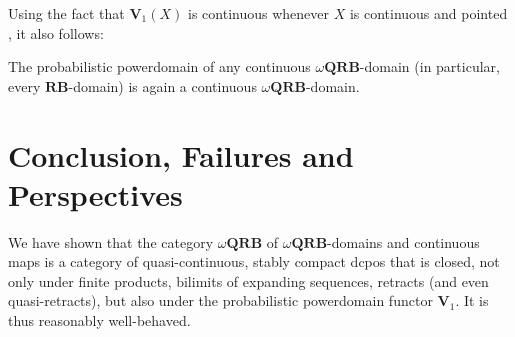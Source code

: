 \documentclass{LMCS}
\newcommand\QRB{\mathbf{QRB}}
\newcommand\RB{\mathbf{RB}}
\newcommand\Val{\mathbf V}
\begin{document}
Using the fact that $\Val_1 (X)$ is continuous whenever $X$ is
continuous and pointed \cite[Section~3]{Edalat:int}, it also follows:
\begin{cor}
  \label{corl:qrb:V}
  The probabilistic powerdomain of any continuous $\omega\QRB$-domain
  (in particular, every $\RB$-domain) is again a continuous
  $\omega\QRB$-domain.  \end{cor}


\section{Conclusion, Failures and Perspectives}
\label{sec:conc}

We have shown that the category $\omega\QRB$ of $\omega\QRB$-domains
and continuous maps is a category of quasi-continuous, stably compact
dcpos that is closed, not only under finite products, bilimits of
expanding sequences, retracts (and even quasi-retracts), but also
under the probabilistic powerdomain functor $\Val_1$.  It is thus
reasonably well-behaved.
\end{document}
